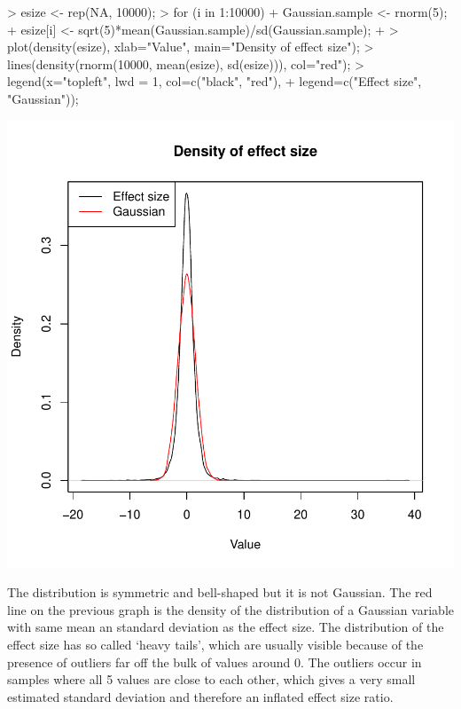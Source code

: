 \documentclass[a4paper]{article}
\theoremstyle{definition}
\begin{document}
\begin{Answer}
\begin{Schunk}
\begin{Sinput}
> esize <- rep(NA, 10000);
> for (i in 1:10000) {
+    Gaussian.sample <- rnorm(5);
+    esize[i] <- sqrt(5)*mean(Gaussian.sample)/sd(Gaussian.sample);
+ }
> plot(density(esize), xlab="Value", main="Density of effect size");
> lines(density(rnorm(10000, mean(esize), sd(esize))), col="red");
> legend(x="topleft", lwd = 1, col=c("black", "red"),
+    legend=c("Effect size", "Gaussian"));
\end{Sinput}
\end{Schunk}
\includegraphics{ttest-010}
\par
The distribution is symmetric and bell-shaped but it is not Gaussian.
The red line on the previous graph is the density of the distribution
of a Gaussian variable with same mean an standard deviation as the
effect size. The distribution of the effect size has so called
`heavy tails', which are usually visible
because of the presence of outliers far off the bulk of values around
0. The outliers occur in samples where all 5 values are close to each
other, which gives a very small estimated standard deviation and
therefore an inflated effect size ratio.
\end{Answer}
\end{document}
